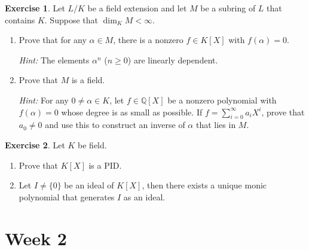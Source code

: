 \documentclass[a4paper,10pt,reqno]{amsart}
\newcommand{\Q}{\mathbb{Q}}
\theoremstyle{definition} %
\newtheorem{ex}{Exercise}[section]
\begin{document}
\begin{ex}
    Let $L/K$ be a field extension and let $M$ be a subring of $L$ that contains $K$. Suppose that $\dim_KM < \infty$.
    \begin{enumerate}[label=(\roman*)]
        \item Prove that for any $\alpha \in M$, there is a nonzero $f \in K[X]$ with $f(\alpha) = 0$.

        \noindent \textit{Hint:} The elements $\alpha^n$ ($n \geq 0$) are linearly dependent.
        
        \item Prove that $M$ is a field.
        
        \noindent \textit{Hint:} For any $0 \neq \alpha \in K$, let $f \in \Q[X]$ be a nonzero polynomial with $f(\alpha) = 0$ whose degree is as small as possible. If $f = \sum_{i=0}^{\infty} a_iX^i$, prove that $a_0 \neq 0$ and use this to construct an inverse of $\alpha$ that lies in $M$.
    \end{enumerate}
\end{ex}

\begin{ex}
Let $K$ be field.
\begin{enumerate}[label=(\roman*)]
    \item Prove that $K[X]$ is a PID.
    \item Let $I\neq \{0\}$ be an ideal of $K[X]$, then there exists a unique monic polynomial that generates $I$ as an ideal.
\end{enumerate}
    
\end{ex}
\section{Week 2}
\end{document}
